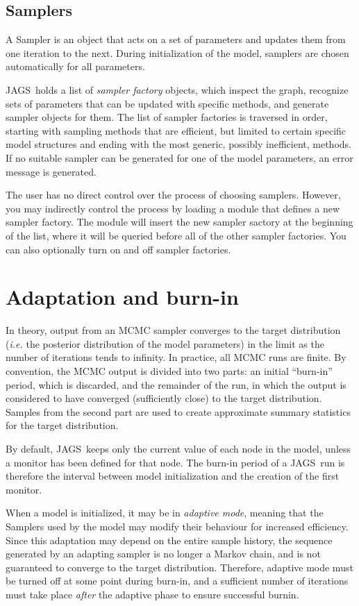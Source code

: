 \documentclass[11pt, a4paper, titlepage]{report}
\newcommand{\JAGS}{\textsf{JAGS}}
\begin{document}
\subsection{Samplers}

A Sampler is an object that acts on a set of parameters and updates
them from one iteration to the next. During initialization of the
model, samplers are chosen automatically for all parameters.

\JAGS\ holds a list of {\em sampler factory} objects, which inspect
the graph, recognize sets of parameters that can be updated with
specific methods, and generate sampler objects for them. The list of
sampler factories is traversed in order, starting with sampling
methods that are efficient, but limited to certain specific model
structures and ending with the most generic, possibly inefficient,
methods. If no suitable sampler can be generated for one of the model
parameters, an error message is generated.

The user has no direct control over the process of choosing
samplers. However, you may indirectly control the process by loading a
module that defines a new sampler factory. The module will insert the
new sampler sactory at the beginning of the list, where it will be
queried before all of the other sampler factories. You can also
optionally turn on and off sampler factories. %
 
\section{Adaptation and burn-in}

In theory, output from an MCMC sampler converges to the target
distribution ({\em i.e.} the posterior distribution of the model
parameters) in the limit as the number of iterations tends to
infinity. In practice, all MCMC runs are finite.  By convention, the
MCMC output is divided into two parts: an initial ``burn-in'' period,
which is discarded, and the remainder of the run, in which the output
is considered to have converged (sufficiently close) to the target
distribution. Samples from the second part are used to create
approximate summary statistics for the target distribution.

By default, \JAGS\ keeps only the current value of each node in the
model, unless a monitor has been defined for that node. The burn-in
period of a \JAGS\ run is therefore the interval between model
initialization and the creation of the first monitor.

When a model is initialized, it may be in {\em adaptive mode}, meaning
that the Samplers used by the model may modify their behaviour for
increased efficiency. Since this adaptation may depend on the entire
sample history, the sequence generated by an adapting sampler is no
longer a Markov chain, and is not guaranteed to converge to the target
distribution. Therefore, adaptive mode must be turned off at some
point during burn-in, and a sufficient number of iterations must take
place {\em after} the adaptive phase to ensure successful burnin.
\end{document}
